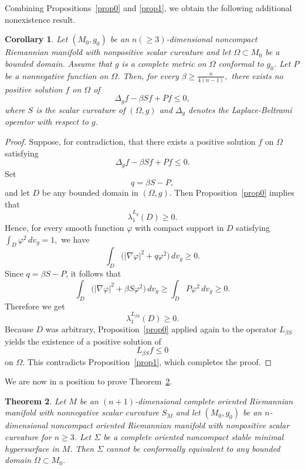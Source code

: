 \documentclass[amssymb,amstex,amsmath,11pt]{article}
\numberwithin{equation}{section}
\theoremstyle{plain}
\newtheorem{thm}{Theorem}[section]
\newtheorem{cor}[thm]{Corollary}
\theoremstyle{definition}
\theoremstyle{remark}
\begin{document}
\noindent Combining Propositions~\ref{prop0} and \ref{prop1}, we obtain the following additional nonexistence result.

\begin{cor}\label{cor2}
Let $(M_0,g_0)$ be an $n(\ge 3)$-dimensional noncompact Riemannian manifold with nonpositive scalar curvature and let $\Omega\subset M_0$ be a bounded domain. Assume that $g$ is a complete metric on $\Omega$ conformal to $g_0$.  Let $P$ be a nonnegative function on $\Omega$. Then, for every
$\beta\ge \frac{n}{4(n-1)},$
there exists no positive solution $f$ on $\Omega$ of
$$
\Delta_g f-\beta S f+Pf\le 0,
$$
where $S$ is the scalar curvature of $(\Omega,g)$ and $\Delta_g$ denotes the Laplace-Beltrami operator with respect to $g$.
\end{cor}

\begin{proof}
Suppose, for contradiction, that there exists a positive solution $f$ on $\Omega$ satisfying
$$
\Delta_g f-\beta S f+Pf\le 0.
$$
Set
$$
q=\beta S-P,
$$
and let $D$ be any bounded domain in $(\Omega,g)$. Then Proposition~\ref{prop0} implies that
$$
\lambda_1^{L_q}(D)\ge 0.
$$
Hence, for every smooth function $\varphi$ with compact support in $D$ satisfying $\int_D \varphi^2\,dv_g=1,$
we have
$$
\int_D \bigl(|\nabla \varphi|^2+q\varphi^2\bigr)\,dv_g\ge 0.
$$
Since $q=\beta S-P$, it follows that
$$
\int_D \bigl(|\nabla \varphi|^2+\beta S\varphi^2\bigr)\,dv_g
\ge
\int_D P\varphi^2\,dv_g
\ge 0.
$$
Therefore we get
$$
\lambda_1^{L_{\beta S}}(D)\ge 0.
$$
Because $D$ was arbitrary, Proposition~\ref{prop0} applied again to the operator $L_{\beta S}$ yields the existence of a positive solution of
$$
L_{\beta S}f\le 0
$$
on $\Omega$. This contradicts Proposition~\ref{prop1}, which completes the proof.
\end{proof}







We are now in a position to prove Theorem~\ref{thmnc}.

\begin{thm}\label{thmnc}
Let $M$ be an $(n+1)$-dimensional complete oriented Riemannian manifold with nonnegative scalar curvature $S_M$ and let $(M_0,g_0)$ be an $n$-dimensional noncompact oriented Riemannian manifold with nonpositive scalar curvature for $n\ge 3$. Let $\Sigma$ be a complete oriented noncompact stable minimal hypersurface in $M$. Then $\Sigma$ cannot be conformally equivalent to any bounded domain $\Omega\subset M_0$.
\end{thm}
\end{document}
